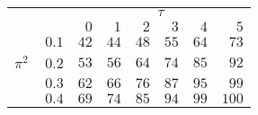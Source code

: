 \begin{tabular}{r|rrrrrr}
\hline\hline
 &\multicolumn{6}{c}{$\tau$} \\ 
  & $0$ & $1$ & $2$ & $3$ & $4$ & $5$ \\ 
 \hline$0.1$ & $ 42$ & $ 44$ & $ 48$ & $ 55$ & $ 64$ & $ 73$\\ 
$\pi^2\;\;\;$ $0.2$ & $ 53$ & $ 56$ & $ 64$ & $ 74$ & $ 85$ & $ 92$\\ 
$0.3$ & $ 62$ & $ 66$ & $ 76$ & $ 87$ & $ 95$ & $ 99$\\ 
$0.4$ & $ 69$ & $ 74$ & $ 85$ & $ 94$ & $ 99$ & $100$\\ 
 \hline 
 \end{tabular}